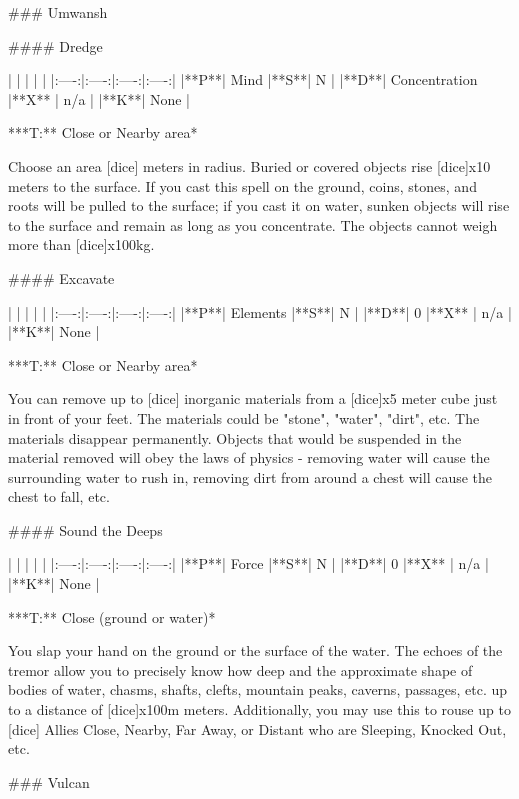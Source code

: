 ### Umwansh





#### Dredge

| | | | |
|:----:|:----:|:----:|:----:|
|**P**| Mind |**S**|  N |
|**D**| Concentration |**X** |  n/a  |
|**K**| None |


***T:**   Close or Nearby area*



Choose an area [dice] meters in radius.  Buried or covered objects rise [dice]x10 meters to the surface.  If you cast this spell on the ground, coins, stones, and roots will be pulled to the surface; if you cast it on water, sunken objects will rise to the surface and remain as long as you concentrate.  The objects cannot weigh more than [dice]x100kg.  




#### Excavate

| | | | |
|:----:|:----:|:----:|:----:|
|**P**| Elements |**S**|  N |
|**D**| 0 |**X** |  n/a  |
|**K**| None |


***T:**   Close or Nearby area*



You can remove up to [dice] inorganic materials from a [dice]x5 meter cube just in front of your feet.  The materials could be "stone", "water", "dirt", etc. The materials disappear permanently. Objects that would be suspended in the material removed will obey the laws of physics - removing water will cause the surrounding water to rush in, removing dirt from around a chest will cause the chest to fall, etc.





#### Sound the Deeps

| | | | |
|:----:|:----:|:----:|:----:|
|**P**| Force |**S**|  N |
|**D**| 0 |**X** |  n/a  |
|**K**| None |


***T:**   Close (ground or water)*



You slap your hand on the ground or the surface of the water.  The echoes of the tremor allow you to precisely know how deep and the approximate shape of bodies of water, chasms, shafts, clefts, mountain peaks, caverns, passages, etc.  up to a distance of [dice]x100m meters.  Additionally, you may use this to rouse up to [dice] Allies Close, Nearby, Far Away, or Distant who are Sleeping, Knocked Out, etc. 



### Vulcan





